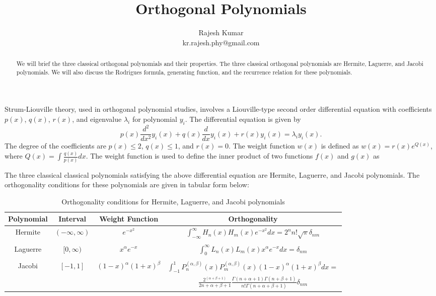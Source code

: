 \documentclass[a4paper, 12pt]{article}
\title{Orthogonal Polynomials}
\author{Rajesh Kumar\\kr.rajesh.phy@gmail.com}
\begin{document}
\maketitle

\begin{abstract}
    We will brief the three classical orthogonal polynomials and their properties. The three classical orthogonal polynomials are Hermite, Laguerre, and Jacobi polynomials. We will also discuss the Rodrigues formula, generating function, and the recurrence relation for these polynomials.
\end{abstract}

Strum-Liouville theory, used in orthogonal polynomial studies, involves a Liouville-type second order differential equation with coefficients $p(x)$, $q(x)$, $r(x)$, and eigenvalue $\lambda_i$ for polynomial $y_i$. The differential equation is given by
\begin{equation}
    p(x)\frac{d^2}{dx^2}y_i(x) + q(x)\frac{d}{dx}y_i(x) + r(x)y_i(x) = \lambda_i y_i(x).
\end{equation}
The degree of the coefficients are $p(x)\le2$, $q(x)\le1$, and $r(x)=0$. The weight function $w(x)$ is defined as $w(x) = r(x)e^{Q(x)}$, where $Q(x) = \int \frac{q(x)}{p(x)}dx$. The weight function is used to define the inner product of two functions $f(x)$ and $g(x)$ as


The three classical classical polynomials satisfying the above differential equation are Hermite, Laguerre, and Jacobi polynomials. The orthogonality conditions for these polynomials are given in tabular form below:
\begin{table}[h]
    \centering
    \begin{tabular}{|c|c|c|c|}
        \hline
        \textbf{Polynomial} & \textbf{Interval} & \textbf{Weight Function} & \textbf{Orthogonality} \\
        \hline
        Hermite & $(-\infty, \infty)$ & $e^{-x^2}$ & $\int_{-\infty}^{\infty} H_n(x)H_m(x)e^{-x^2}dx = 2^n n! \sqrt{\pi}\delta_{nm}$ \\
        & & & \\
        Laguerre & $[0, \infty)$ & $x^{\alpha}e^{-x}$ & $\int_{0}^{\infty} L_n(x)L_m(x)x^{\alpha}e^{-x}dx = \delta_{nm}$ \\
        & & & \\
        Jacobi & $[-1, 1]$ & $(1-x)^\alpha(1+x)^\beta$ & $\int_{-1}^{1} P_n^{(\alpha, \beta)}(x)P_m^{(\alpha, \beta)}(x)(1-x)^\alpha(1+x)^\beta dx =$\\& & & $\frac{2^{(\alpha+\beta+1)}}{2n+\alpha+\beta+1}\frac{\Gamma(n+\alpha+1)\Gamma(n+\beta+1)}{n!\Gamma(n+\alpha+\beta+1)}\delta_{nm}$ \\
        \hline
    \end{tabular}
    \caption{Orthogonality conditions for Hermite, Laguerre, and Jacobi polynomials}
    \label{tab:my_label}
\end{table}






%
%
\end{document}
